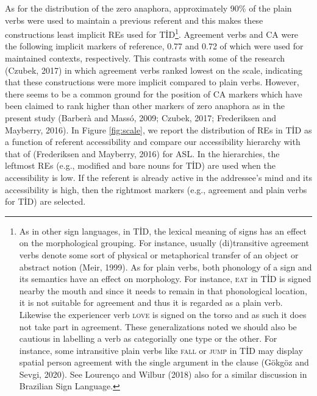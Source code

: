 \documentclass[]{elsarticle} %
\begin{document}
As for the distribution of the zero anaphora, approximately 90\% of the
plain verbs were used to maintain a previous referent and this makes
these constructions least implicit REs used for TİD\footnote{As in other
  sign languages, in TİD, the lexical meaning of signs has an effect on
  the morphological grouping. For instance, usually (di)transitive
  agreement verbs denote some sort of physical or metaphorical transfer
  of an object or abstract notion (Meir, 1999). As for plain verbs, both
  phonology of a sign and its semantics have an effect on morphology.
  For instance, \textsc{eat} in TİD is signed nearby the mouth and since
  it needs to remain in that phonological location, it is not suitable
  for agreement and thus it is regarded as a plain verb. Likewise the
  experiencer verb \textsc{love} is signed on the torso and as such it
  does not take part in agreement. These generalizations noted we should
  also be cautious in labelling a verb as categorially one type or the
  other. For instance, some intransitive plain verbs like \textsc{fall}
  or \textsc{jump} in TİD may display spatial person agreement with the
  single argument in the clause (Gökgöz and Sevgi, 2020). See Lourenço
  and Wilbur (2018) also for a similar discussion in Brazilian Sign
  Language.}. Agreement verbs and CA were the following implicit markers
of reference, 0.77 and 0.72 of which were used for maintained contexts,
respectively. This contrasts with some of the research (Czubek, 2017) in
which agreement verbs ranked lowest on the scale, indicating that these
constructions were more implicit compared to plain verbs. However, there
seems to be a common ground for the position of CA markers which have
been claimed to rank higher than other markers of zero anaphora as in
the present study (Barberà and Massó, 2009; Czubek, 2017; Frederiksen
and Mayberry, 2016). In Figure \ref{fig:scale}, we report the
distribution of REs in TİD as a function of referent accessibility and
compare our accessibility hierarchy with that of (Frederiksen and
Mayberry, 2016) for ASL. In the hierarchies, the leftmost REs (e.g.,
modified and bare nouns for TİD) are used when the accessibility is low.
If the referent is already active in the addressee's mind and its
accessibility is high, then the rightmost markers (e.g., agreement and
plain verbs for TİD) are selected.
\end{document}

